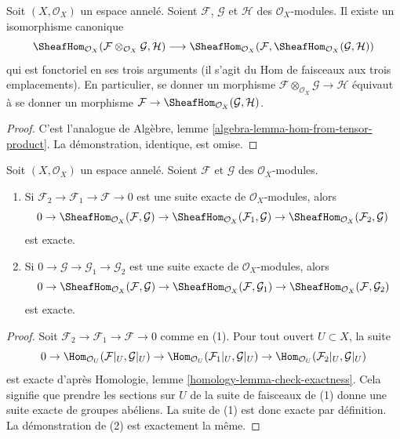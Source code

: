 \begin{lemma}
\label{lemma-internal-hom}
Soit $(X, \mathcal{O}_X)$ un espace annelé.
Soient $\mathcal{F}$, $\mathcal{G}$ et $\mathcal{H}$ des $\mathcal{O}_X$-modules.
Il existe un isomorphisme canonique
$$
\SheafHom_{\mathcal{O}_X}
(\mathcal{F} \otimes_{\mathcal{O}_X} \mathcal{G}, \mathcal{H})
\longrightarrow
\SheafHom_{\mathcal{O}_X}
(\mathcal{F}, \SheafHom_{\mathcal{O}_X}(\mathcal{G}, \mathcal{H}))
$$
qui est fonctoriel en ses trois arguments (il s'agit du Hom de faisceaux
aux trois emplacements). En particulier, se donner un
morphisme $\mathcal{F} \otimes_{\mathcal{O}_X} \mathcal{G} \to \mathcal{H}$
équivaut à se donner un morphisme
$\mathcal{F} \to \SheafHom_{\mathcal{O}_X}(\mathcal{G}, \mathcal{H})$.
\end{lemma}

\begin{proof}
C'est l'analogue de
Algèbre, lemme \ref{algebra-lemma-hom-from-tensor-product}.
La démonstration, identique, est omise.
\end{proof}

\begin{lemma}
\label{lemma-internal-hom-exact}
Soit $(X, \mathcal{O}_X)$ un espace annelé.
Soient $\mathcal{F}$ et $\mathcal{G}$ des $\mathcal{O}_X$-modules.
\begin{enumerate}
\item Si $\mathcal{F}_2 \to \mathcal{F}_1 \to \mathcal{F} \to 0$
est une suite exacte de $\mathcal{O}_X$-modules, alors
$$
0 \to
\SheafHom_{\mathcal{O}_X}(\mathcal{F}, \mathcal{G}) \to
\SheafHom_{\mathcal{O}_X}(\mathcal{F}_1, \mathcal{G}) \to
\SheafHom_{\mathcal{O}_X}(\mathcal{F}_2, \mathcal{G})
$$
est exacte.
\item Si $0 \to \mathcal{G} \to \mathcal{G}_1 \to \mathcal{G}_2$
est une suite exacte de $\mathcal{O}_X$-modules, alors
$$
0 \to
\SheafHom_{\mathcal{O}_X}(\mathcal{F}, \mathcal{G}) \to
\SheafHom_{\mathcal{O}_X}(\mathcal{F}, \mathcal{G}_1) \to
\SheafHom_{\mathcal{O}_X}(\mathcal{F}, \mathcal{G}_2)
$$
est exacte.
\end{enumerate}
\end{lemma}

\begin{proof}
Soit $\mathcal{F}_2 \to \mathcal{F}_1 \to \mathcal{F} \to 0$
comme en (1). Pour tout ouvert $U \subset X$, la suite
$$
0 \to \Hom_{\mathcal{O}_U}(\mathcal{F}|_U, \mathcal{G}|_U) \to
\Hom_{\mathcal{O}_U}(\mathcal{F}_1|_U, \mathcal{G}|_U) \to
\Hom_{\mathcal{O}_U}(\mathcal{F}_2|_U, \mathcal{G}|_U)
$$
est exacte d'après Homologie, lemme \ref{homology-lemma-check-exactness}.
Cela signifie que
prendre les sections sur $U$ de la suite de faisceaux de (1) donne
une suite exacte de groupes abéliens. La suite de (1) est donc exacte
par définition. La démonstration de (2) est exactement la même.
\end{proof}

